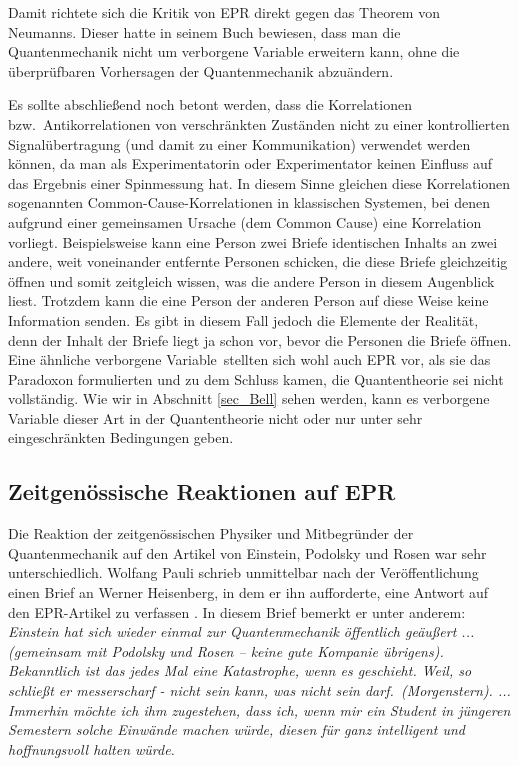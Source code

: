 Damit richtete sich die Kritik von EPR direkt gegen das Theorem von Neumanns.
Dieser hatte in seinem Buch bewiesen, dass man die Quantenmechanik
nicht um verborgene Variable erweitern kann, ohne die \"uberpr\"ufbaren Vorhersagen
der Quantenmechanik abzu\"andern. 
 
Es sollte abschlie\ss end noch betont werden, dass die
Korrelationen bzw.\ Antikorrelationen von verschr\"ankten
Zust\"anden nicht zu einer kontrollierten Signal\-\"uber\-tragung
(und damit zu einer Kommunikation) verwendet
werden k\"onnen, da man als Experimentatorin oder Experimentator 
keinen Einfluss auf das Ergebnis einer Spinmessung hat. In diesem Sinne gleichen diese
Korrelationen sogenannten Common-Cause-Korrelationen
in klassischen Systemen, bei
denen aufgrund einer gemeinsamen Ursache (dem Common Cause) eine
Korrelation vorliegt. Beispielsweise kann eine Person zwei
Briefe identischen Inhalts an zwei andere, weit voneinander
entfernte Personen schicken, die diese Briefe gleichzeitig
\"offnen und somit zeitgleich wissen, was die andere Person
in diesem Augenblick liest. Trotzdem kann die eine Person
der anderen Person auf diese Weise keine Information senden.
Es gibt in diesem Fall jedoch die
\glqq Elemente der Realit\"at\grqq, denn der Inhalt der
Briefe liegt ja schon vor, bevor die Personen die Briefe
\"offnen. Eine \"ahnliche \glqq verborgene Variable\grqq\
stellten sich wohl auch EPR vor, als sie das Paradoxon
formulierten und zu dem Schluss kamen, die Quantentheorie sei nicht
vollst\"andig. Wie wir in Abschnitt \ref{sec_Bell} sehen werden,
kann es verborgene Variable dieser Art in der Quantentheorie
nicht oder nur unter sehr eingeschr\"ankten Bedingungen geben.

\subsection{Zeitgen\"ossische Reaktionen auf EPR}

Die Reaktion der zeitgen\"ossischen Physiker und 
Mitbegr\"under der Quantenmechanik auf den Artikel von Einstein,
Podolsky und Rosen war sehr
unterschiedlich. 
Wolfang Pauli schrieb unmittelbar nach der
Ver\"offentlichung einen Brief an Werner 
Heisenberg, in dem
er ihn aufforderte, eine Antwort auf den EPR-Artikel
zu verfassen \cite{Pauli}. In diesem Brief bemerkt er unter anderem:
\textit{Einstein hat sich wieder einmal zur Quantenmechanik
\"offentlich ge\"au\ss ert ... (gemeinsam mit Podolsky und Rosen --
keine gute Kompanie \"ubrigens). Bekanntlich ist das jedes
Mal eine Katastrophe, wenn es geschieht. \glq Weil, so schlie\ss t
er messerscharf - nicht sein kann, was nicht sein darf.\grq\ 
(Morgenstern). ... Immerhin m\"ochte ich ihm zugestehen,
dass ich, wenn mir ein Student in j\"ungeren Semestern
solche Einw\"ande machen w\"urde, diesen f\"ur ganz
intelligent und hoffnungsvoll halten w\"urde.} \cite{Pauli}


